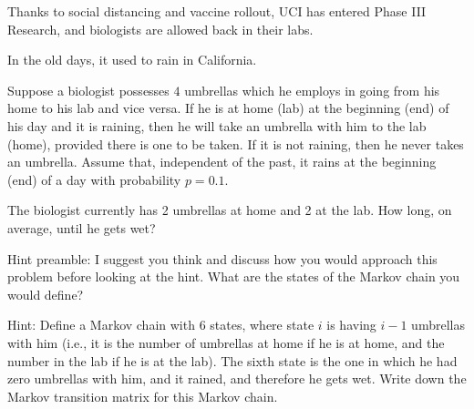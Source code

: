 \documentclass[12pt,letterpaper]{article}
\begin{document}



Thanks to social distancing and vaccine rollout, UCI has entered Phase III Research, and biologists are allowed back in their labs.

In the old days, it used to rain in California.

Suppose a biologist possesses $4$ umbrellas which he employs in going from his home to his lab and vice versa. If he is at home (lab) at the beginning (end) of his day and it is raining, then he will take an umbrella with him to the lab (home), provided there is one to be taken. If it is not raining, then he never takes an umbrella. Assume that, independent of the past, it rains at the beginning (end) of a day with probability $p=0.1$.

The biologist currently has 2 umbrellas at home and 2 at the lab. How long, on average, until he gets wet? 

\vspace{3em}

Hint preamble: I suggest you think and discuss how you would approach this problem before looking at the hint. What are the states of the Markov chain you would define?

Hint: Define a Markov chain with $6$ states, where state $i$ is having $i-1$ umbrellas with him (i.e., it is the number of umbrellas at home if he is at home, and the number in the lab if he is at the lab). The sixth state is the one in which he had zero umbrellas with him, and it rained, and therefore he gets wet. Write down the Markov transition matrix for this Markov chain. 



\end{document}
